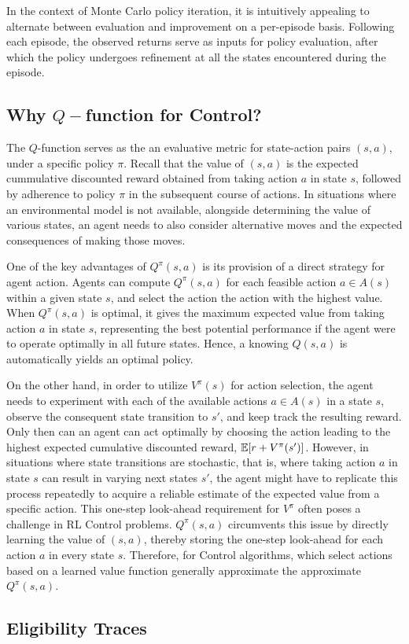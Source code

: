 In the context of Monte Carlo policy iteration, it is intuitively appealing to alternate between evaluation and improvement on a per-episode basis. Following each episode, the observed returns serve as inputs for policy evaluation, after which the policy undergoes refinement at all the states encountered during the episode.

\subsection{Why $Q-$function for Control?}

The $Q$-function serves as the an evaluative metric for state-action pairs $(s,a)$, under a specific policy $\pi$. Recall that the value of $(s,a)$ is the expected cummulative discounted reward obtained from taking action $a$ in state $s$, followed by adherence to policy $\pi$ in the subsequent course of actions.
In situations where an environmental model is not available, alongside determining the value of various states, an agent needs to also consider alternative moves and the expected consequences of making those moves. 

One of the key advantages of $Q^{\pi}(s,a)$ is its provision of a direct strategy for agent action. 
Agents can compute $Q^{\pi}(s,a)$ for each feasible action $a \in A(s)$ within a given state $s$, and select the action the action with the highest value.
When $Q^{\pi}(s,a)$ is optimal, it gives the maximum expected value from taking action $a$ in state $s$, representing the best potential performance if the agent were to operate optimally in all future states. Hence, a knowing $Q(s,a)$ is automatically yields an optimal policy.

On the other hand, in order to utilize $V^{\pi}(s)$ for action selection, the agent needs to experiment with each of the available actions $a \in A(s)$ in a state $s$, observe the consequent state transition to $s'$, and keep track the resulting reward. Only then can an agent can act optimally by choosing the action leading to the highest expected cumulative discounted reward,  $\mathbb E[r + V^{\pi}(s')]$. 
However, in situations where state transitions are stochastic, that is, where taking action $a$ in state $s$ can result in varying next states $s'$, the agent might have to replicate this process repeatedly to acquire a reliable estimate of the expected value from a specific action. This one-step look-ahead requirement for $V^{\pi}$ often poses a challenge in RL Control problems. $Q^{\pi}(s,a)$ circumvents this issue by directly learning the value of $(s,a)$, thereby storing the one-step look-ahead for each action $a$ in every state $s$. Therefore, for Control algorithms, which select actions based on a learned value function generally approximate the approximate $Q^{\pi}(s,a)$.

\subsection{Eligibility Traces}